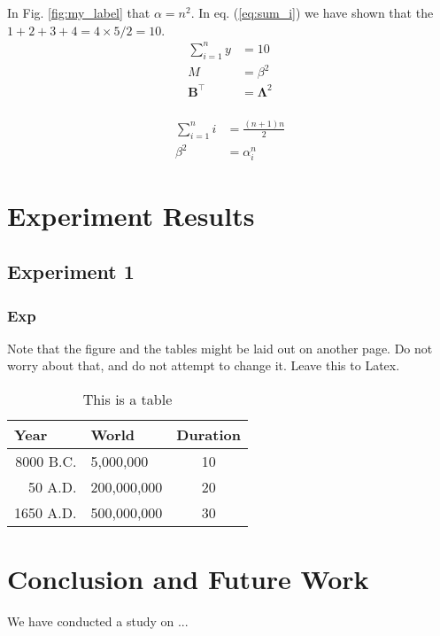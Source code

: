 \documentclass{svproc}
\begin{document}
    
    In Fig. \ref{fig:my_label} that $\alpha = n^2$. In eq. (\ref{eq:sum_i}) we have shown that the $ 1+2+3+4 = 4\times 5 /2=10$.
    \begin{align*}
        \sum_{i=1}^{n} y &= 10 \\
        M &= \beta ^2 \\
        \boldsymbol{B}^\top &= \boldsymbol{\Lambda}^2 \\
    \end{align*}
    
    \begin{align}
        \label{eq:sum_i}
        \sum_{i=1}^n i &= \frac{(n+1)n}{2} \\  
        \nonumber
        \beta ^2 &= \alpha_i^n
    \end{align}

\section{Experiment Results}
    \subsection{Experiment 1}
        \subsubsection{Exp}
    Note that the figure and the tables might be laid out on another page. Do not worry about that, and do not attempt to change it. Leave this to Latex.
    
    
    \begin{table}
        \caption{This is a table}
        \begin{center}
            \begin{tabular}{rlc}
                \hline
                \multicolumn{1}{l}{Year}&\multicolumn{1}{l}{World}&\multicolumn{1}{l}{Duration}\\
                \hline
                8000 B.C.  &     5,000,000 &  10\\
                  50 A.D.  &   200,000,000 &  20\\
                1650 A.D.  &   500,000,000 &  30\\
                \hline
            \end{tabular}
        \end{center}
    \end{table}

\section{Conclusion and Future Work}
We have conducted a study on ...

\printbibliography 
\end{document}
